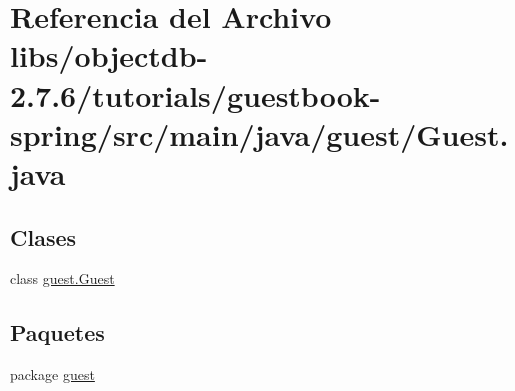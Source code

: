 \hypertarget{guestbook-spring_2src_2main_2java_2guest_2_guest_8java}{}\section{Referencia del Archivo libs/objectdb-\/2.7.6/tutorials/guestbook-\/spring/src/main/java/guest/\+Guest.java}
\label{guestbook-spring_2src_2main_2java_2guest_2_guest_8java}
\subsection*{Clases}
\begin{DoxyCompactItemize}
\item 
class \mbox{\hyperlink{classguest_1_1_guest}{guest.\+Guest}}
\end{DoxyCompactItemize}
\subsection*{Paquetes}
\begin{DoxyCompactItemize}
\item 
package \mbox{\hyperlink{namespaceguest}{guest}}
\end{DoxyCompactItemize}
